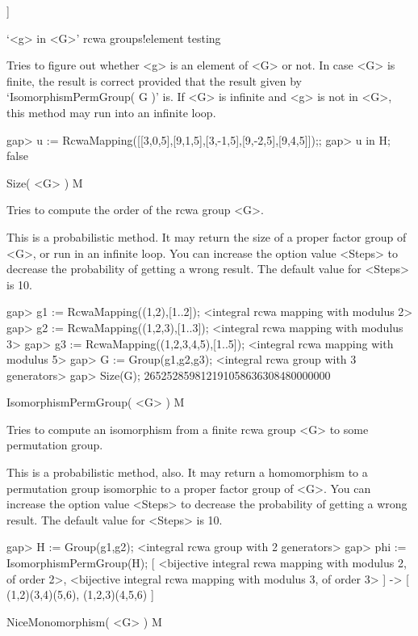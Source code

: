 ]

\endexample


\>`<g> in <G>' {rcwa groups!element testing}

Tries to figure out whether <g> is an element of <G> or not.
In case <G> is finite, the result is correct provided that the result
given by `IsomorphismPermGroup( G )' is.
If <G> is infinite and <g> is not in <G>, this method may run into an
infinite loop.

\beginexample
gap> u := RcwaMapping([[3,0,5],[9,1,5],[3,-1,5],[9,-2,5],[9,4,5]]);; 
gap> u in H;
false
\endexample

\>Size( <G> ) M

Tries to compute the order of the rcwa group <G>.

This is a probabilistic method.
It may return the size of a proper factor group of <G>, or run in an
infinite loop. You can increase the option value <Steps> to decrease the
probability of getting a wrong result. The default value for <Steps>
is 10.

\beginexample
gap> g1 := RcwaMapping((1,2),[1..2]);
<integral rcwa mapping with modulus 2>
gap> g2 := RcwaMapping((1,2,3),[1..3]);
<integral rcwa mapping with modulus 3>
gap> g3 := RcwaMapping((1,2,3,4,5),[1..5]);
<integral rcwa mapping with modulus 5>
gap> G := Group(g1,g2,g3);
<integral rcwa group with 3 generators>
gap> Size(G);
265252859812191058636308480000000
\endexample

\>IsomorphismPermGroup( <G> ) M

Tries to compute an isomorphism from a finite rcwa group <G> to some
permutation group.

This is a probabilistic method, also.
It may return a homomorphism to a permutation group isomorphic to a
proper factor group of <G>. You can increase the option value <Steps> to
decrease the probability of getting a wrong result. The default value
for <Steps> is 10.

\beginexample
gap> H := Group(g1,g2);
<integral rcwa group with 2 generators>
gap> phi := IsomorphismPermGroup(H);
[ <bijective integral rcwa mapping with modulus 2, of order 2>,
  <bijective integral rcwa mapping with modulus 3, of order 3> ] ->
[ (1,2)(3,4)(5,6), (1,2,3)(4,5,6) ]                                             
\endexample

\>NiceMonomorphism( <G> ) M

